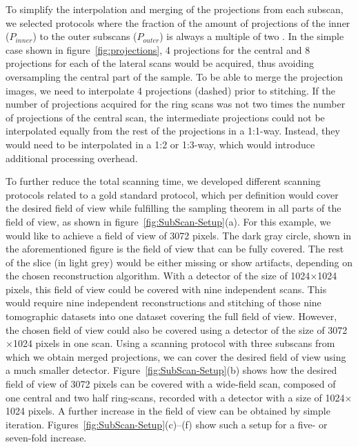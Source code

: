 To simplify the interpolation and merging of the projections from each subscan, we selected protocols where the fraction of the amount of projections of the inner ($P_{inner}$) to the outer subscans ($P_{outer}$) is always a multiple of two%
. In the simple case shown in figure~\ref{fig:projections}, 4 projections for the central and 8 projections for each of the lateral scans would be acquired, thus avoiding oversampling the central part of the sample. To be able to merge the projection images, we need to interpolate 4 projections (dashed) prior to stitching. If the number of projections acquired for the ring scans was not two times the number of projections of the central scan, the intermediate projections could not be interpolated equally from the rest of the projections in a 1:1-way. Instead, they would need to be interpolated in a 1:2 or 1:3-way, which would introduce additional processing overhead.

To further reduce the total scanning time, we developed different scanning protocols related to a gold standard protocol, which per definition would cover the desired field of view while fulfilling the sampling theorem in all parts of the field of view, as shown in figure~\ref{fig:SubScan-Setup}(a). For this example, we would like to achieve a field of view of 3072 pixels. The dark gray circle, shown in the aforementioned figure is the field of view that can be fully covered. The rest of the slice (in light grey) would be either missing or show artifacts, depending on the chosen reconstruction algorithm. With a detector of the size of 1024$\times$1024 pixels, this field of view could be covered with nine independent scans. This would require nine independent reconstructions and stitching of those nine tomographic datasets into one dataset covering the full field of view. However, the chosen field of view could also be covered using a detector of the size of 3072$\times$1024 pixels in one scan. Using a scanning protocol with three subscans from which we obtain merged projections, we can cover the desired field of view using a much smaller detector. Figure~\ref{fig:SubScan-Setup}(b) shows how the desired field of view of 3072 pixels can be covered with a wide-field scan, composed of one central and two half ring-scans, recorded with a detector with a size of 1024$\times$1024 pixels. A further increase in the field of view can be obtained by simple iteration. Figures~\ref{fig:SubScan-Setup}(c)--(f) show such a setup for a five- or seven-fold increase.

